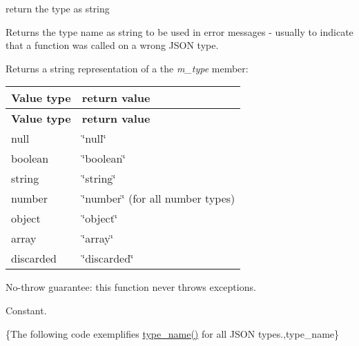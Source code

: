 return the type as string 

Returns the type name as string to be used in error messages -\/ usually to indicate that a function was called on a wrong J\+S\+ON type.

\begin{DoxyReturn}{Returns}
a string representation of a the {\itshape m\+\_\+type} member\+: \tabulinesep=1mm
\begin{longtabu} spread 0pt [c]{*{2}{|X[-1]}|}
\hline
\rowcolor{\tableheadbgcolor}\textbf{ Value type  }&\textbf{ return value   }\\
\endfirsthead
\hline
\endfoot
\hline
\rowcolor{\tableheadbgcolor}\textbf{ Value type  }&\textbf{ return value   }\\
\endhead
null  &{\ttfamily \char`\"{}null\char`\"{}}   \\
boolean  &{\ttfamily \char`\"{}boolean\char`\"{}}   \\
string  &{\ttfamily \char`\"{}string\char`\"{}}   \\
number  &{\ttfamily \char`\"{}number\char`\"{}} (for all number types)   \\
object  &{\ttfamily \char`\"{}object\char`\"{}}   \\
array  &{\ttfamily \char`\"{}array\char`\"{}}   \\
discarded  &{\ttfamily \char`\"{}discarded\char`\"{}}   \\
\end{longtabu}

\end{DoxyReturn}
No-\/throw guarantee\+: this function never throws exceptions.

Constant.

\{The following code exemplifies {\ttfamily \mbox{\hyperlink{classnlohmann_1_1basic__json_a9d75f6b5393b23a683d69605f9fb1f55}{type\+\_\+name()}}} for all J\+S\+ON types.,type\+\_\+name\}

